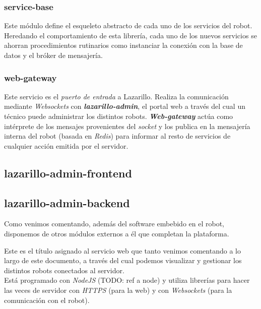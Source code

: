 \subsubsection{service-base}

Este módulo define el esqueleto abstracto de cada uno de los servicios del robot. Heredando el comportamiento de esta librería, cada uno de los nuevos servicios se ahorran procedimientos rutinarios como instanciar la conexión con la base de datos y el bróker de mensajería.

\subsubsection{web-gateway}

Este servicio es el \textit{puerto de entrada} a Lazarillo. Realiza la comunicación mediante \textit{Websockets} con \textbf{\textit{lazarillo-admin}}, el portal web a través del cual un técnico puede administrar los distintos robots. \textit{\textbf{Web-gateway}} actúa como intérprete de los mensajes provenientes del \textit{socket} y los publica en la mensajería interna del robot (basada en \textit{Redis}) para informar al resto de servicios de cualquier acción emitida por el servidor.


\subsection{lazarillo-admin-frontend}
\subsection{lazarillo-admin-backend}

Como venimos comentando, además del software embebido en el robot, disponemos de otros módulos externos a él que completan la plataforma.

Este es el título asignado al servicio web que tanto venimos comentando a lo largo de este documento, a través del cual podemos visualizar y gestionar los distintos robots conectados al servidor.\\

Está programado con \textit{NodeJS} (TODO: ref a node) y utiliza librerías para hacer las veces de servidor con \textit{HTTPS} (para la web) y con \textit{Websockets} (para la comunicación con el robot).\\

